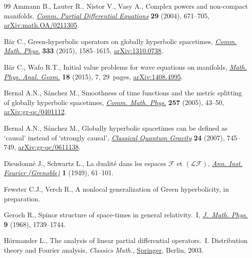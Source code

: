 \documentclass[11pt]{article}
\numberwithin{equation}{section}
\numberwithin{equation}{section}
\begin{document}
\begin{thebibliography}{99}
Ammann B., Lauter R., Nistor V., Vasy A., Complex powers and non-compact
 manifolds, \href{https://doi.org/10.1081/PDE-120037329}{\textit{Comm. Partial Differential Equations}} \textbf{29} (2004),
 671--705, \href{https://arxiv.org/abs/math.OA/0211305}{arXiv:math.OA/0211305}.

B\"ar C., Green-hyperbolic operators on globally hyperbolic spacetimes,
 \href{https://doi.org/10.1007/s00220-014-2097-7}{\textit{Comm. Math. Phys.}} \textbf{333} (2015), 1585--1615,
 \href{https://arxiv.org/abs/1310.0738}{arXiv:1310.0738}.

B\"ar C., Wafo R.T., Initial value problems for wave equations on manifolds,
 \href{https://doi.org/10.1007/s11040-015-9176-7}{\textit{Math. Phys. Anal. Geom.}} \textbf{18} (2015), 7, 29~pages,
 \href{https://arxiv.org/abs/1408.4995}{arXiv:1408.4995}.

Bernal A.N., S\'{a}nchez M., Smoothness of time functions and the metric
 splitting of globally hyperbolic spacetimes, \href{https://doi.org/10.1007/s00220-005-1346-1}{\textit{Comm. Math. Phys.}}
 \textbf{257} (2005), 43--50, \href{https://arxiv.org/abs/gr-qc/0401112}{arXiv:gr-qc/0401112}.

Bernal A.N., S\'{a}nchez M., Globally hyperbolic spacetimes can be defined as
 `causal' instead of `strongly causal', \href{https://doi.org/10.1088/0264-9381/24/3/N01}{\textit{Classical Quantum Gravity}}
 \textbf{24} (2007), 745--749, \href{https://arxiv.org/abs/gr-qc/0611138}{arXiv:gr-qc/0611138}.

Dieudonn\'e J., Schwartz L., La dualit\'e dans les espaces {$\mathcal{F}$} et
 {$(\mathcal{LF})$}, \href{https://doi.org/10.5802/aif.8}{\textit{Ann. Inst. Fourier (Grenoble)}} \textbf{1} (1949),
 61--101.

Fewster C.J., Verch R., A nonlocal generalization of {G}reen hyperbolicity,
 {i}n preparation.

Geroch R., Spinor structure of space-times in general relativity.~{I},
 \href{https://doi.org/10.1063/1.1664507}{\textit{J.~Math. Phys.}} \textbf{9} (1968), 1739--1744.

H\"ormander L., The analysis of linear partial differential operators.~{I}.
 {D}istribution theory and Fourier analysis, \textit{Classics Math.}, \href{https://doi.org/10.1007/978-3-642-61497-2}{Springer}, Berlin,
 2003.


\end{thebibliography}
\end{document}
